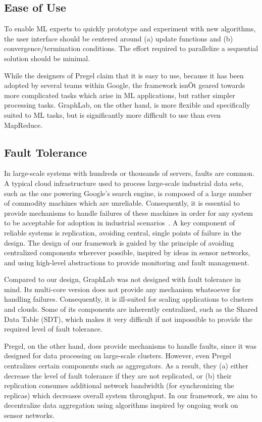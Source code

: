 \documentclass[acmtocl]{acmtrans2m}
\begin{document}
\subsection{Ease of Use}

To enable ML experts to quickly prototype and experiment with new algorithms, the user interface should be centered around (a) update functions and (b) convergence/termination conditions. The effort required to parallelize a sequential solution should be minimal.

While the designers of Pregel claim that it is easy to use, because it has been adopted by several teams within Google, the framework isnÕt geared towards more complicated tasks which arise in ML applications, but rather simpler processing tasks. GraphLab, on the other hand, is more flexible and specifically suited to ML tasks, but is significantly more difficult to use than even MapReduce.

\subsection{Fault Tolerance}

In large-scale systems with hundreds or thousands of servers, faults are common. A typical cloud infrastructure used to process large-scale industrial data sets, such as the one powering Google's search engine, is composed of a large number of commodity machines which are unreliable. Consequently, it is essential to provide mechanisms to handle failures of these machines in order for any system to be acceptable for adoption in industrial scenarios~\cite{ChangDGHWBCFG08}. A key component of reliable systems is replication, avoiding central, single points of failure in the design. The design of our framework is guided by the principle of avoiding centralized components wherever possible, inspired by ideas in sensor networks, and using high-level abstractions to provide monitoring and fault management.

Compared to our design, GraphLab was not designed with fault tolerance in mind. Its multi-core version does not provide any mechanism whatsoever for handling failures. Consequently, it is ill-suited for scaling applications to clusters and clouds. Some of its components are inherently centralized, such as the Shared Data Table (SDT), which makes it very difficult if not impossible to provide the required level of fault tolerance.

Pregel, on the other hand, does provide mechanisms to handle faults, since it was designed for data processing on large-scale clusters. However, even Pregel centralizes certain components such as aggregators. As a result, they (a) either decrease the level of fault tolerance if they are not replicated, or (b) their replication consumes additional network bandwidth (for synchronizing the replicas) which decreases overall system throughput. In our framework, we aim to decentralize data aggregation using algorithms inspired by ongoing work on sensor networks.
\end{document}
